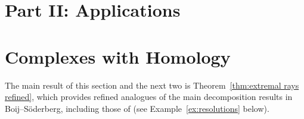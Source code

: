 \documentclass[12pt]{amsart}
\theoremstyle{definition}
\newtheorem{example}[lemma]{Example}
\theoremstyle{remark}
\newcommand{\kk}{\Bbbk}
\newcommand{\PP}{\mathbb{P}}
\newcommand{\cO}{\mathcal{O}}
\newcommand{\cE}{\mathcal{E}}
\newcommand{\cF}{\mathcal{F}}
\newcommand{\FF}{\mathbf{F}}
\newcommand{\zp}{\circ}
\newcommand{\daniel}[1]{{\color{green} \sf $\clubsuit\clubsuit\clubsuit$ Daniel: [#1]}}
\begin{document}

\section*{Part II: Applications}
\section{Complexes with Homology}\label{sec:refined}
The main result of this section and the next two is Theorem~\ref{thm:extremal rays refined}, which provides refined analogues of the main decomposition results in Boij--S\"oderberg, including those of \cites{eis-schrey1,boij-sod2} (see Example~\ref{ex:resolutions} below).  
\end{document}
